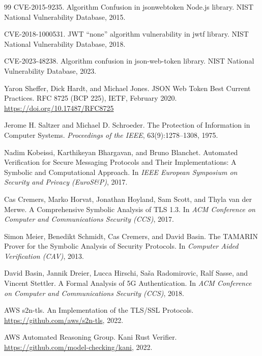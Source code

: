 \documentclass[11pt,a4paper]{article}
\theoremstyle{definition}
\begin{document}
\begin{thebibliography}{99}
CVE-2015-9235.
\newblock Algorithm Confusion in jsonwebtoken Node.js library.
\newblock NIST National Vulnerability Database, 2015.

CVE-2018-1000531.
\newblock JWT ``none'' algorithm vulnerability in jwtf library.
\newblock NIST National Vulnerability Database, 2018.

CVE-2023-48238.
\newblock Algorithm confusion in json-web-token library.
\newblock NIST National Vulnerability Database, 2023.

Yaron Sheffer, Dick Hardt, and Michael Jones.
\newblock JSON Web Token Best Current Practices.
\newblock RFC 8725 (BCP 225), IETF, February 2020.
\newblock \url{https://doi.org/10.17487/RFC8725}

Jerome H. Saltzer and Michael D. Schroeder.
\newblock The Protection of Information in Computer Systems.
\newblock \textit{Proceedings of the IEEE}, 63(9):1278--1308, 1975.

Nadim Kobeissi, Karthikeyan Bhargavan, and Bruno Blanchet.
\newblock Automated Verification for Secure Messaging Protocols and Their Implementations: A Symbolic and Computational Approach.
\newblock In \textit{IEEE European Symposium on Security and Privacy (EuroS\&P)}, 2017.

Cas Cremers, Marko Horvat, Jonathan Hoyland, Sam Scott, and Thyla van der Merwe.
\newblock A Comprehensive Symbolic Analysis of TLS 1.3.
\newblock In \textit{ACM Conference on Computer and Communications Security (CCS)}, 2017.

Simon Meier, Benedikt Schmidt, Cas Cremers, and David Basin.
\newblock The TAMARIN Prover for the Symbolic Analysis of Security Protocols.
\newblock In \textit{Computer Aided Verification (CAV)}, 2013.

David Basin, Jannik Dreier, Lucca Hirschi, Saša Radomirovic, Ralf Sasse, and Vincent Stettler.
\newblock A Formal Analysis of 5G Authentication.
\newblock In \textit{ACM Conference on Computer and Communications Security (CCS)}, 2018.

AWS s2n-tls.
\newblock An Implementation of the TLS/SSL Protocols.
\newblock \url{https://github.com/aws/s2n-tls}, 2022.

AWS Automated Reasoning Group.
\newblock Kani Rust Verifier.
\newblock \url{https://github.com/model-checking/kani}, 2022.


\end{thebibliography}
\end{document}
